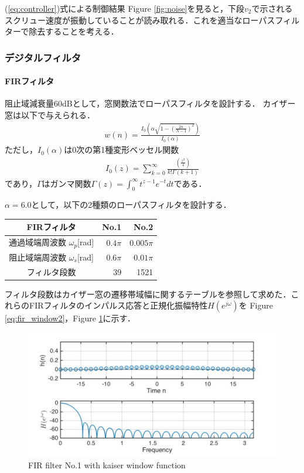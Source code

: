 \documentclass[twocolumn,oneside,a4paper]{article}
\begin{document}
(\ref{eq:controller})式による制御結果
Figure \ref{fig:noise}を見ると，下段$v_2$で示されるスクリュー速度が振動していることが読み取れる．これを適当なローパスフィルターで除去することを考える．

\subsubsection{デジタルフィルタ}
\paragraph{FIRフィルタ}
阻止域減衰量60dBとして，窓関数法でローパスフィルタを設計する．
カイザー窓は以下で与えられる．
\begin{eqnarray*}
	w(n) = \frac{I_0 \left( \alpha \sqrt{1-\left(\frac{2n}{N-1}\right)^2} \right) }{I_0(\alpha)}	
\end{eqnarray*}
ただし，$I_0({\alpha})$は0次の第1種変形ベッセル関数
\begin{eqnarray*}
 I_0(z)	= \sum_{k=0}^{\infty}\frac{\left(\frac{z^2}{4}\right)}{k!\Gamma (k+1)}
\end{eqnarray*}
であり，$\Gamma$はガンマ関数$\Gamma(z) = \int_0^{\infty} t^{z-1}e^{-t} dt$である．

$\alpha = 6.0$として，以下の2種類のローパスフィルタを設計する．

\begin{tabular}{crr}
\toprule
FIRフィルタ  & No.1 & No.2 \\
\midrule
通過域端周波数 $\omega_p$[rad] & $0.4 \pi$ & $0.005 \pi$ \\
阻止域端周波数 $\omega_s$[rad] & $0.6 \pi$ & $0.01 \pi$ \\
フィルタ段数 & 39 & 1521 \\
\bottomrule
\end{tabular}


フィルタ段数はカイザー窓の遷移帯域幅に関するテーブルを参照して求めた．これらのFIRフィルタのインパルス応答と正規化振幅特性$H(e^{j \omega})$を Figure \ref{eq:fir_window2}，Figure \ref{eq:fir_window}に示す．


\begin{figure}[htbp]
    \includegraphics[bb=0 0 432 216,width=1\columnwidth]{impulse_h.pdf}
    \caption{FIR filter No.1 with kaiser window function}
   \label{eq:fir_window}
\end{figure}
\end{document}
